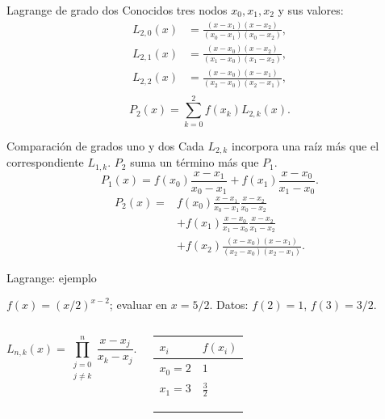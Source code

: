 \documentclass[original_version/main.tex]{subfiles}
\begin{document}
\begin{frame}[t]{Lagrange de grado dos}
\small Conocidos tres nodos $x_0,x_1,x_2$ y sus valores:\begin{align*}L_{2,0}(x)&=\frac{(x-x_1)(x-x_2)}{(x_0-x_1)(x_0-x_2)},\\L_{2,1}(x)&=\frac{(x-x_0)(x-x_2)}{(x_1-x_0)(x_1-x_2)},\\L_{2,2}(x)&=\frac{(x-x_0)(x-x_1)}{(x_2-x_0)(x_2-x_1)},\\\end{align*}\[P_2(x)=\sum_{k=0}^2f(x_k)L_{2,k}(x).\]
\end{frame}
\begin{frame}[t]{Comparación de grados uno y dos}
\small Cada $L_{2,k}$ incorpora una raíz más que el correspondiente $L_{1,k}$. $P_2$ suma un término más que $P_1$.
\[P_1(x)=f(x_0)\frac{x-x_1}{x_0-x_1}+f(x_1)\frac{x-x_0}{x_1-x_0}.\]
\begin{align*}
P_2(x)={}&f(x_0)\frac{x-x_1}{x_0-x_1}\frac{x-x_2}{x_0-x_2}\\
&+f(x_1)\frac{x-x_0}{x_1-x_0}\frac{x-x_2}{x_1-x_2}\\
&+f(x_2)\frac{(x-x_0)(x-x_1)}{(x_2-x_0)(x_2-x_1)}.
\end{align*}
\end{frame}
\begin{frame}[t]{Lagrange: ejemplo}
\par\noindent\begin{minipage}[t][7.5mm][t]{\textwidth}\small\strut $f(x)=(x/2)^{x-2}$; evaluar en $x=5/2$. Datos: $f(2)=1$, $f(3)=3/2$.\end{minipage}\par\nointerlineskip
\begin{columns}[T]\small\setlength{\abovedisplayskip}{4pt}\setlength{\belowdisplayskip}{4pt}\[L_{n,k}(x)=\prod_{\substack{j=0\\j\ne k}}^n\frac{x-x_j}{x_k-x_j}.\]\begingroup\small\setlength{\tabcolsep}{3pt}\begin{center}\begin{tabular}{|C{.42\textwidth}|C{.42\textwidth}|}\hline
\rule[-2mm]{0pt}{6mm}$x_i$&$f(x_i)$\\\hline
\rule[-2.5mm]{0pt}{6mm}$x_0=2$&$1$\\\hline
\rule[-2.5mm]{0pt}{6mm}$x_1=3$&$\frac{3}{2}$\\\hline
\rule[-2.5mm]{0pt}{6mm}&\\\hline
\rule[-2.5mm]{0pt}{6mm}&\\\hline
\rule[-2.5mm]{0pt}{6mm}&\\\hline
\end{tabular}\end{center}\endgroup\par
\end{columns}
\end{frame}
\end{document}
